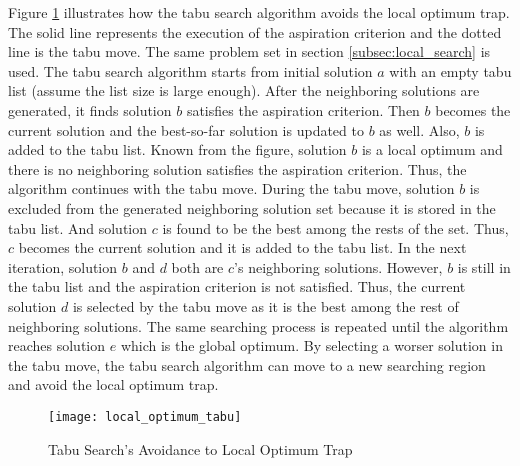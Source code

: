		Figure \ref{fig:local_optimum_tabu} illustrates how the tabu search algorithm avoids the local optimum trap. The solid line represents the execution of the aspiration criterion and the dotted line is the tabu move.
		The same problem set in section \ref{subsec:local_search} is used. The tabu search algorithm starts from initial solution $a$ with an empty tabu list (assume the list size is large enough).
		After the neighboring solutions are generated, it finds solution $b$ satisfies the aspiration criterion. Then $b$ becomes the current
		solution and the best-so-far solution is updated to $b$ as well. Also, $b$ is added to the tabu list. Known from the figure, solution $b$ is
		a local optimum and there is no neighboring solution satisfies the aspiration criterion. Thus, the algorithm continues with the tabu move.
		During the tabu move, solution $b$ is excluded from the generated neighboring solution set because it is stored in the tabu list.
		And solution $c$ is found to be the best among the rests of the set. Thus, $c$ becomes the current solution and it is added to the tabu list.
		In the next iteration, solution $b$ and $d$ both are $c$'s neighboring solutions. However, $b$ is still in the tabu list and the aspiration
		criterion is not satisfied. Thus, the current solution $d$ is selected by the tabu move as it is the best among the rest of neighboring solutions.
		The same searching process is repeated until the algorithm reaches solution $e$ which is the global optimum.
		By selecting a worser solution in the tabu move, the tabu search algorithm can move to a new searching region and avoid the local optimum trap.
	
		\begin{figure}[H]
			\begin{center}
				\texttt{[image: local\_optimum\_tabu]}
				\caption[Tabu Search's Avoidance to Local Optimum Trap]{Tabu Search's Avoidance to Local Optimum Trap}
				\label{fig:local_optimum_tabu}
			\end{center}
		\end{figure}
				
		
		
		
		
		
		
		
		
		
		
		
		
		
		
